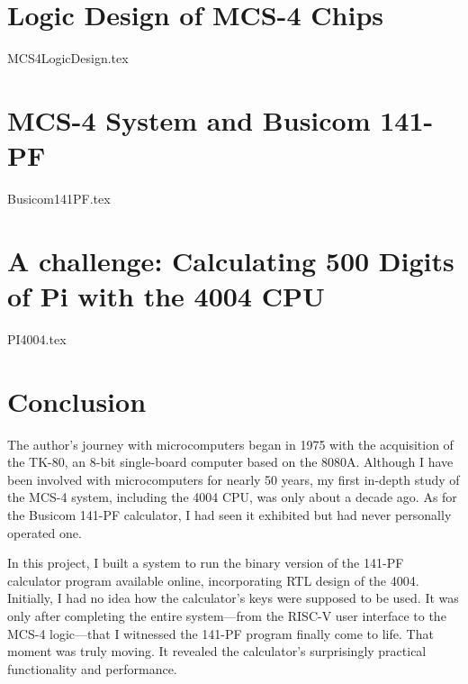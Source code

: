 \documentclass[dvipdfmx, a4paper,12pt]{book}
\begin{document}
\newpage\chapter{Logic Design of MCS-4 Chips}
{MCS4LogicDesign.tex}

\newpage\chapter{MCS-4 System and Busicom 141-PF}
{Busicom141PF.tex}

\newpage\chapter{A challenge: Calculating 500 Digits of Pi with the 4004 CPU}
{PI4004.tex}

\newpage\chapter{Conclusion}
The author's journey with microcomputers began in 1975 with the acquisition of the TK-80, an 8-bit single-board computer based on the 8080A. Although I have been involved with microcomputers for nearly 50 years, my first in-depth study of the MCS-4 system, including the 4004 CPU, was only about a decade ago. As for the Busicom 141-PF calculator, I had seen it exhibited but had never personally operated one.

In this project, I built a system to run the binary version of the 141-PF calculator program available online, incorporating RTL design of the 4004. Initially, I had no idea how the calculator's keys were supposed to be used. It was only after completing the entire system—from the RISC-V user interface to the MCS-4 logic—that I witnessed the 141-PF program finally come to life. That moment was truly moving. It revealed the calculator's surprisingly practical functionality and performance.
\end{document}
